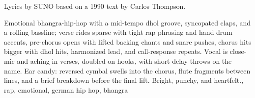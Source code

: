 \begin{notes}
Lyrics by SUNO based on a 1990 text by Carlos Thompson.
\end{notes}

\begin{style}
Emotional bhangra-hip-hop with a mid-tempo dhol groove, syncopated claps, and a rolling bassline; verse rides sparse with tight rap phrasing and hand drum accents, pre-chorus opens with lifted backing chants and snare pushes, chorus hits bigger with dhol hits, harmonized lead, and call-response repeats. %
Vocal is close-mic and aching in verses, doubled on hooks, with short delay throws on the name. %
Ear candy: reversed cymbal swells into the chorus, flute fragments between lines, and a brief breakdown before the final lift. %
Bright, punchy, and heartfelt., rap, emotional, german hip hop, bhangra
\end{style}

